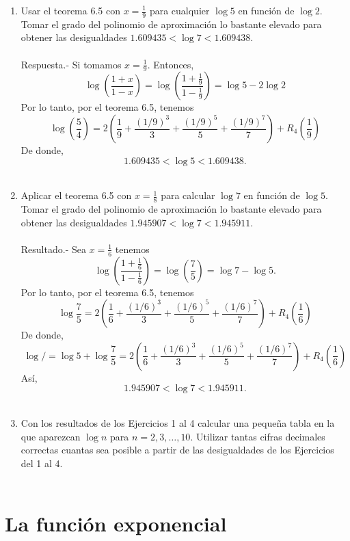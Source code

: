 \begin{enumerate}[1.]
    \item Usar el teorema 6.5 con $x=\frac{1}{9}$ para cualquier $\log 5$ en función de $\log 2$. Tomar el grado del polinomio  de aproximación lo bastante elevado para obtener las desigualdades $1.609435<\log 7 < 1.609438.$\\\\
	Respuesta.-\; Si tomamos $x=\frac{1}{9}$. Entonces,
	$$\log\left(\dfrac{1+x}{1-x}\right)=\log\left(\dfrac{1+\frac{1}{9}}{1-\frac{1}{9}}\right)=\log 5 - 2\log 2$$
	Por lo tanto, por el teorema 6.5, tenemos
	$$\log\left(\dfrac{5}{4}\right)=2\left(\dfrac{1}{9}+\dfrac{(1/9)^3}{3}+\dfrac{(1/9)^5}{5}+\dfrac{(1/9)^7}{7}\right)+R_4\left(\dfrac{1}{9}\right)$$
	De donde,
	$$1.609435<\log 5 < 1.609438.$$\\

    \item Aplicar el teorema 6.5 con $x=\frac{1}{8}$ para calcular $\log 7$ en función de $\log 5$. Tomar el grado del polinomio de aproximación lo bastante elevado para obtener las desigualdades $1.945907<\log 7 < 1.945911.$\\\\
	Resultado.-\; Sea $x=\frac{1}{6}$ tenemos
	$$\log\left(\dfrac{1+\frac{1}{6}}{1-\frac{1}{6}}\right)=\log\left(\dfrac{7}{5}\right)=\log 7 - \log 5.$$
	Por lo tanto, por el teorema 6.5, tenemos
	$$\log \dfrac{7}{5} = 2\left(\dfrac{1}{6}+\dfrac{(1/6)^3}{3}+\dfrac{(1/6)^5}{5}+\dfrac{(1/6)^7}{7}\right) + R_4\left(\dfrac{1}{6}\right)$$
	De donde,
	$$\log / = \log 5 + \log \dfrac{7}{5} = 2\left(\dfrac{1}{6}+\dfrac{(1/6)^3}{3}+\dfrac{(1/6)^5}{5}+\dfrac{(1/6)^7}{7}\right) + R_4\left(\dfrac{1}{6}\right)$$
	Así,
	$$1.945907<\log 7 < 1.945911.$$\\

    \item Con los resultados de los Ejercicios 1 al 4 calcular una pequeña tabla en la que aparezcan $\log n$ para $n = 2, 3, \ldots , 10$. Utilizar tantas cifras decimales correctas cuantas sea posible a partir de las desigualdades de los Ejercicios del 1 al 4.\\\\

\end{enumerate}

\section{La función exponencial}
